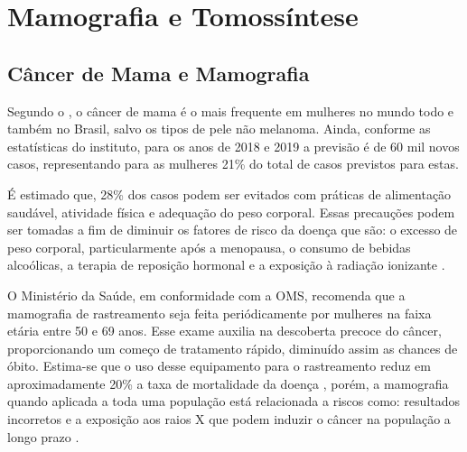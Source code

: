 \chapter[Mamografia e Tomossíntese]{Mamografia e Tomossíntese}\label{Capitulo2}

\section{Câncer de Mama e Mamografia}

Segundo o , o câncer de mama é o mais frequente em mulheres no mundo todo e também no Brasil, salvo os tipos de pele não melanoma. Ainda, conforme as estatísticas do instituto, para os anos de 2018 e 2019 a previsão é de 60 mil novos casos, representando para as mulheres 21\% do total de casos previstos para estas. 

É estimado que, 28\% dos casos podem ser evitados com práticas de alimentação saudável, atividade física  e adequação do peso corporal. Essas precauções podem ser tomadas a fim de diminuir os fatores de risco da doença que são: o excesso de peso corporal, particularmente após a menopausa, o consumo de bebidas alcoólicas, a terapia de reposição hormonal e a exposição à radiação ionizante \cite{inca}.

O Ministério da Saúde, em conformidade com a \ac{OMS}, recomenda que a mamografia de rastreamento seja feita periódicamente por mulheres na faixa etária entre 50 e 69 anos. Esse exame auxilia na descoberta precoce do câncer, proporcionando um começo de tratamento rápido, diminuído assim as chances de óbito. Estima-se que o uso desse equipamento para o rastreamento reduz em aproximadamente 20\% a taxa de mortalidade da doença \cite{oms}, porém, a mamografia quando aplicada a toda uma população está relacionada a riscos como: resultados incorretos e a exposição aos raios X que podem induzir o câncer na população a longo prazo \cite{yaffe2011risk,inca}. 


